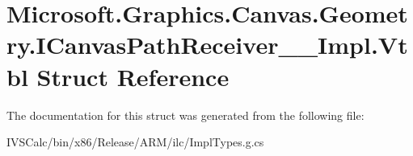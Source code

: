 \hypertarget{struct_microsoft_1_1_graphics_1_1_canvas_1_1_geometry_1_1_i_canvas_path_receiver_____impl_1_1_vtbl}{}\section{Microsoft.\+Graphics.\+Canvas.\+Geometry.\+I\+Canvas\+Path\+Receiver\+\_\+\+\_\+\+Impl.\+Vtbl Struct Reference}
\label{struct_microsoft_1_1_graphics_1_1_canvas_1_1_geometry_1_1_i_canvas_path_receiver_____impl_1_1_vtbl}


The documentation for this struct was generated from the following file\+:\begin{DoxyCompactItemize}
\item 
I\+V\+S\+Calc/bin/x86/\+Release/\+A\+R\+M/ilc/Impl\+Types.\+g.\+cs\end{DoxyCompactItemize}
